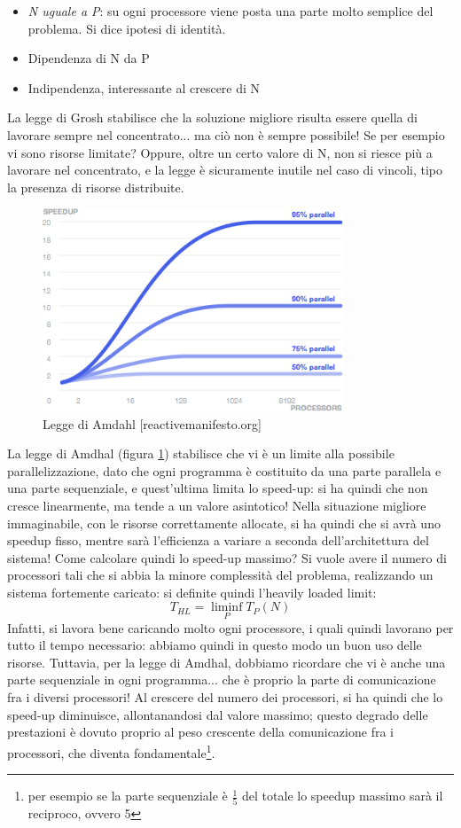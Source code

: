 \begin{itemize}
 \item \textit{N uguale a P}: su ogni processore viene posta una parte molto semplice del problema. Si dice ipotesi
 di identità.
 \item Dipendenza di N da P
 \item Indipendenza, interessante al crescere di N
\end{itemize}
La legge di Grosh stabilisce che la soluzione migliore risulta essere quella
di lavorare sempre nel concentrato... ma ciò non è sempre possibile! Se per
esempio vi sono risorse limitate? Oppure, oltre un certo valore di N, non si
riesce più a lavorare nel concentrato, e la legge è sicuramente inutile nel caso
di vincoli, tipo la presenza di risorse distribuite.
\begin{figure}[htbp]
 \centering
 \includegraphics[width=0.8\textwidth]{Images/amdahl.png}
 \caption{Legge di Amdahl [reactivemanifesto.org]}
 \label{fig:amdahl}
\end{figure}
La legge di Amdhal (figura \ref{fig:amdahl}) stabilisce che vi è un limite alla
possibile parallelizzazione, dato che ogni programma è
costituito da una parte parallela e una parte sequenziale, e quest'ultima limita lo speed-up: si ha quindi che non
cresce linearmente, ma tende a un valore asintotico! Nella situazione migliore immaginabile, con le risorse
correttamente allocate, si ha quindi che si avrà uno speedup fisso, mentre sarà l'efficienza a variare a seconda
dell'architettura del sistema!
Come calcolare quindi lo speed-up massimo? Si vuole avere il numero di processori tali che si abbia la minore
complessità del problema, realizzando un sistema fortemente caricato: si definite quindi l'heavily loaded limit:
\begin{equation}
 T_{HL} = \liminf_P{T_P(N)}
\end{equation}
Infatti, si lavora bene caricando molto ogni processore, i quali quindi lavorano per tutto il tempo necessario:
abbiamo quindi in questo modo un buon uso delle risorse.
Tuttavia, per la legge di Amdhal, dobbiamo ricordare che vi è anche una parte sequenziale in ogni programma... che è
proprio la parte di comunicazione fra i diversi processori! Al crescere del numero dei processori, si ha quindi
che lo speed-up diminuisce, allontanandosi dal valore massimo; questo degrado delle prestazioni è dovuto proprio al
peso crescente della comunicazione fra i processori, che diventa fondamentale\footnote{per esempio se la parte
sequenziale è $\frac{1}{5}$ del totale lo speedup massimo sarà il reciproco, ovvero 5}.
